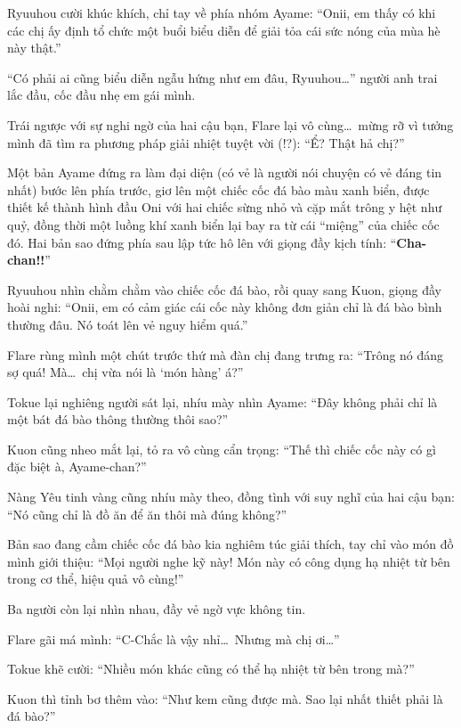 \documentclass[../main.tex]{subfiles}
\begin{document}
Ryuuhou cười khúc khích, chỉ tay về phía nhóm Ayame: ``Onii, em thấy có khi các chị ấy định tổ chức một buổi biểu diễn để giải tỏa cái sức nóng của mùa hè này thật.''

``Có phải ai cũng biểu diễn ngẫu hứng như em đâu, Ryuuhou\dots'' người anh trai lắc đầu, cốc đầu nhẹ em gái mình.

Trái ngược với sự nghi ngờ của hai cậu bạn, Flare lại vô cùng\dots\ mừng rỡ vì tưởng mình đã tìm ra phương pháp giải nhiệt tuyệt vời (!?): ``Ể? Thật hả chị?''

Một bản Ayame đứng ra làm đại diện (có vẻ là người nói chuyện có vẻ đáng tin nhất) bước lên phía trước, giơ lên một chiếc cốc đá bào màu xanh biển, được thiết kế thành hình đầu Oni với hai chiếc sừng nhỏ và cặp mắt trông y hệt như quỷ, đồng thời một luồng khí xanh biển lại bay ra từ cái ``miệng'' của chiếc cốc đó. Hai bản sao đứng phía sau lập tức hô lên với giọng đầy kịch tính: ``\textbf{Cha-chan!!}''


Ryuuhou nhìn chằm chằm vào chiếc cốc đá bào, rồi quay sang Kuon, giọng đầy hoài nghi: ``Onii, em có cảm giác cái cốc này không đơn giản chỉ là đá bào bình thường đâu. Nó toát lên vẻ nguy hiểm quá.''

Flare rùng mình một chút trước thứ mà đàn chị đang trưng ra: ``Trông nó đáng sợ quá! Mà\dots\ chị vừa nói là `món hàng' á?''

Tokue lại nghiêng người sát lại, nhíu mày nhìn Ayame: ``Đây không phải chỉ là một bát đá bào thông thường thôi sao?''

Kuon cũng nheo mắt lại, tỏ ra vô cùng cẩn trọng: ``Thế thì chiếc cốc này có gì đặc biệt à, Ayame-chan?''

Nàng Yêu tinh vàng cũng nhíu mày theo, đồng tình với suy nghĩ của hai cậu bạn: ``Nó cũng chỉ là đồ ăn để ăn thôi mà đúng không?''

Bản sao đang cầm chiếc cốc đá bào kia nghiêm túc giải thích, tay chỉ vào món đồ mình giới thiệu: ``Mọi người nghe kỹ này! Món này có công dụng hạ nhiệt từ bên trong cơ thể, hiệu quả vô cùng!''

Ba người còn lại nhìn nhau, đầy vẻ ngờ vực không tin.

Flare gãi má mình: ``C-Chắc là vậy nhỉ\dots\ Nhưng mà chị ơi\dots''

Tokue khẽ cười: ``Nhiều món khác cũng có thể hạ nhiệt từ bên trong mà?''

Kuon thì tỉnh bơ thêm vào: ``Như kem cũng được mà. Sao lại nhất thiết phải là đá bào?''
\end{document}
